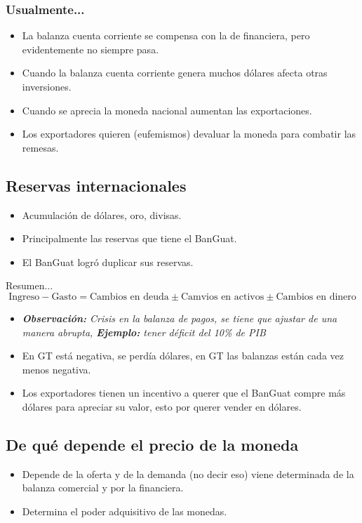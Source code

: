 \subsubsection{Usualmente...}
\begin{itemize}
    \item La balanza cuenta corriente se compensa con la de financiera, pero evidentemente no siempre pasa.
    \item Cuando la balanza cuenta corriente genera muchos dólares afecta otras inversiones.
    \item Cuando se aprecia la moneda nacional aumentan las exportaciones.
    \item Los exportadores quieren (eufemismos) devaluar la moneda para combatir las remesas.
\end{itemize}
\subsection{Reservas internacionales}
\begin{itemize}
    \item Acumulación de dólares, oro, divisas.
    \item Principalmente las reservas que tiene el BanGuat.
    \item El BanGuat logró duplicar sus reservas.
\end{itemize}

Resumen...
\[
  \text{Ingreso} - \text{Gasto} = \text{Cambios en deuda} \pm \text{Camvios en activos} \pm \text{Cambios en dinero}
\]

\begin{itemize}
    \item \emph{\textbf{Observación: }Crisis en la balanza de pagos, se tiene que ajustar de una manera abrupta, \emph{\textbf{Ejemplo: }tener déficit del 10\% de PIB}}
    \item En GT está negativa, se perdía dólares, en GT las balanzas están cada vez menos negativa.
    \item Los exportadores tienen un incentivo a querer que el BanGuat  compre más dólares para apreciar su valor, esto por querer vender en dólares.
\end{itemize}

\subsection{De qué depende el precio de la moneda}
\begin{itemize}
    \item Depende de la oferta y de la demanda (no decir eso) viene determinada de la balanza comercial y por la financiera.
    \item Determina el poder adquisitivo de las monedas. 
\end{itemize}

